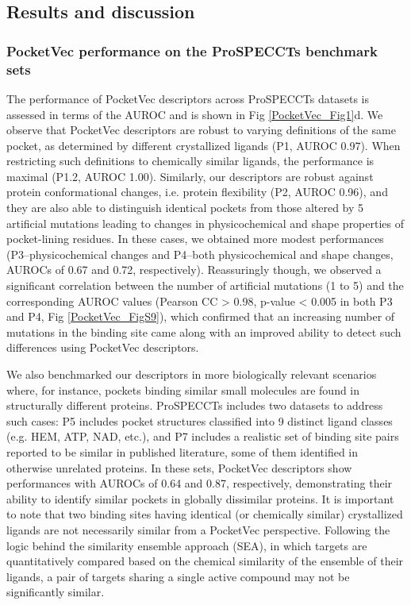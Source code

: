 \subsection{Results and discussion}


\subsubsection{PocketVec performance on the ProSPECCTs benchmark sets}
\label{PocketVec_ResultsAndDiscussion_PocketVec_performance_on_the_ProSPECCTs_benchmark}

The performance of PocketVec descriptors across ProSPECCTs datasets is assessed in terms of the AUROC and is shown in Fig \ref{PocketVec_Fig1}d. We observe that PocketVec descriptors are robust to varying definitions of the same pocket, as determined by different crystallized ligands (P1, AUROC 0.97). When restricting such definitions to chemically similar ligands, the performance is maximal (P1.2, AUROC 1.00). Similarly, our descriptors are robust against protein conformational changes, i.e. protein flexibility (P2, AUROC 0.96), and they are also able to distinguish identical pockets from those altered by 5 artificial mutations leading to changes in physicochemical and shape properties of pocket-lining residues. In these cases, we obtained more modest performances (P3--physicochemical changes and P4--both physicochemical and shape changes, AUROCs of 0.67 and 0.72, respectively). Reassuringly though, we observed a significant correlation between the number of artificial mutations (1 to 5) and the corresponding AUROC values (Pearson CC > 0.98, p-value < 0.005 in both P3 and P4, Fig \ref{PocketVec_FigS9}), which confirmed that an increasing number of mutations in the binding site came along with an improved ability to detect such differences using PocketVec descriptors. 

We also benchmarked our descriptors in more biologically relevant scenarios where, for instance, pockets binding similar small molecules are found in structurally different proteins. ProSPECCTs includes two datasets to address such cases: P5 includes pocket structures classified into 9 distinct ligand classes (e.g. HEM, ATP, NAD, etc.), and P7 includes a realistic set of binding site pairs reported to be similar in published literature, some of them identified in otherwise unrelated proteins. In these sets, PocketVec descriptors show performances with AUROCs of 0.64 and 0.87, respectively, demonstrating their ability to identify similar pockets in globally dissimilar proteins. It is important to note that two binding sites having identical (or chemically similar) crystallized ligands are not necessarily similar from a PocketVec perspective. Following the logic behind the similarity ensemble approach (SEA\cite{keiser_relating_2007}), in which targets are quantitatively compared based on the chemical similarity of the ensemble of their ligands, a pair of targets sharing a single active compound may not be significantly similar.

